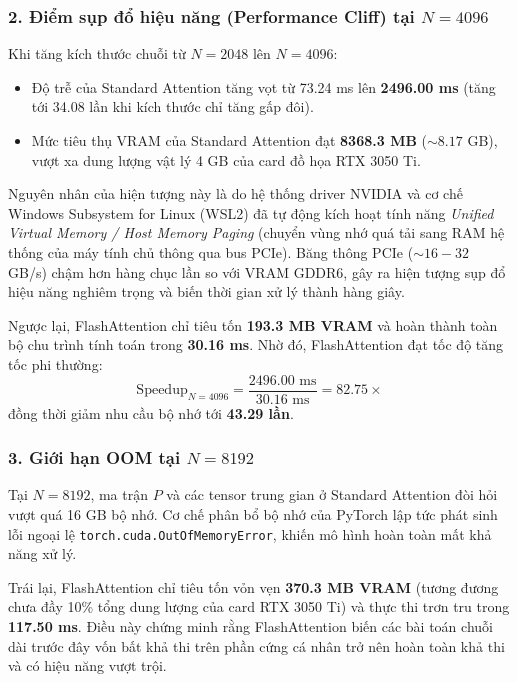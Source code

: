 \documentclass[10pt,a4paper]{article}
\begin{document}
\subsubsection{2. Điểm sụp đổ hiệu năng (Performance Cliff) tại \texorpdfstring{$N = 4096$}{N = 4096}}
Khi tăng kích thước chuỗi từ $N = 2048$ lên $N = 4096$:
\begin{itemize}
    \item Độ trễ của Standard Attention tăng vọt từ 73.24 ms lên \textbf{2496.00 ms} (tăng tới 34.08 lần khi kích thước chỉ tăng gấp đôi).
    \item Mức tiêu thụ VRAM của Standard Attention đạt \textbf{8368.3 MB} ($\sim 8.17$ GB), vượt xa dung lượng vật lý 4 GB của card đồ họa RTX 3050 Ti.
\end{itemize}
Nguyên nhân của hiện tượng này là do hệ thống driver NVIDIA và cơ chế Windows Subsystem for Linux (WSL2) đã tự động kích hoạt tính năng \textit{Unified Virtual Memory / Host Memory Paging} (chuyển vùng nhớ quá tải sang RAM hệ thống của máy tính chủ thông qua bus PCIe). Băng thông PCIe ($\sim 16 - 32$ GB/s) chậm hơn hàng chục lần so với VRAM GDDR6, gây ra hiện tượng sụp đổ hiệu năng nghiêm trọng và biến thời gian xử lý thành hàng giây.

Ngược lại, FlashAttention chỉ tiêu tốn \textbf{193.3 MB VRAM} và hoàn thành toàn bộ chu trình tính toán trong \textbf{30.16 ms}. Nhờ đó, FlashAttention đạt tốc độ tăng tốc phi thường:
\begin{equation}
\text{Speedup}_{N=4096} = \frac{2496.00\text{ ms}}{30.16\text{ ms}} = \mathbf{82.75\times}
\end{equation}
đồng thời giảm nhu cầu bộ nhớ tới \textbf{43.29 lần}.

\subsubsection{3. Giới hạn OOM tại \texorpdfstring{$N = 8192$}{N = 8192}}
Tại $N = 8192$, ma trận $P$ và các tensor trung gian ở Standard Attention đòi hỏi vượt quá 16 GB bộ nhớ. Cơ chế phân bổ bộ nhớ của PyTorch lập tức phát sinh lỗi ngoại lệ \texttt{torch.cuda.OutOfMemoryError}, khiến mô hình hoàn toàn mất khả năng xử lý.

Trái lại, FlashAttention chỉ tiêu tốn vỏn vẹn \textbf{370.3 MB VRAM} (tương đương chưa đầy 10\% tổng dung lượng của card RTX 3050 Ti) và thực thi trơn tru trong \textbf{117.50 ms}. Điều này chứng minh rằng FlashAttention biến các bài toán chuỗi dài trước đây vốn bất khả thi trên phần cứng cá nhân trở nên hoàn toàn khả thi và có hiệu năng vượt trội.
\end{document}
